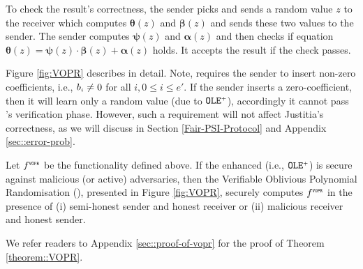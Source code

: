 To check the result's correctness, the sender picks and sends a random value $z$ to the receiver which computes  $\bm\theta(z)$ and $\bm\beta(z)$ and sends these two values  to the sender. The sender computes  $\bm\psi(z)$ and $\bm\alpha(z)$ and then checks if equation  $\bm\theta({ z})=\bm\psi({ z})\cdot \bm\beta({ z})+\bm\alpha({ z})$ holds. It accepts the result if the check passes.   

Figure \ref{fig:VOPR} describes \vopr in detail. Note, \vopr requires the sender to insert non-zero coefficients, i.e., $b_{\scriptscriptstyle i}\neq 0$ for all $i,0 \leq i \leq e'$. If the   sender inserts a zero-coefficient, then it will learn only a random value (due to  $\mathtt{OLE}^{\scriptscriptstyle +}$), accordingly it cannot pass \vopr's verification phase. However, such a requirement will not affect Justitia's correctness, as we will discuss in Section \ref{Fair-PSI-Protocol} and Appendix \ref{sec::error-prob}.  

\vspace{-3mm}



\vspace{-1mm}
\begin{theorem}\label{theorem::VOPR}
%
Let $f^{\scriptscriptstyle \mathtt{VOPR}}$ be the functionality defined above. If the enhanced \ole (i.e., $\mathtt{OLE}^{\scriptscriptstyle +}$) is secure against malicious (or active) adversaries, then the  Verifiable Oblivious Polynomial Randomisation (\vopr), presented in Figure \ref{fig:VOPR}, securely computes $f^{\scriptscriptstyle \mathtt{VOPR}}$ in the presence of (i) semi-honest sender and honest receiver or (ii) malicious receiver and honest sender. 
%
\end{theorem}

We refer readers to Appendix \ref{sec::proof-of-vopr} for the proof of Theorem \ref{theorem::VOPR}. 




%

